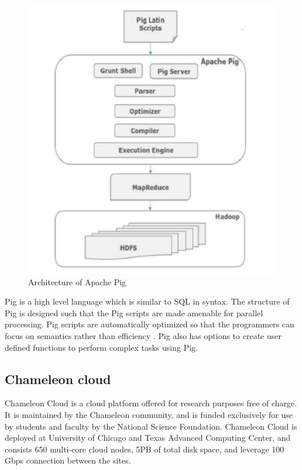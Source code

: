 \documentclass[9pt,twocolumn,twoside]{../../styles/osajnl}
\begin{document}
\begin{figure}[hptb]
\centering
\includegraphics[width=\linewidth]{images/PigArch.PNG}
\caption{ Architecture of Apache Pig \cite{www-opensource}}
\label{fig:Pig}
\end{figure}

Pig is a high level language which is similar to SQL in syntax. The structure of Pig is designed such that the Pig scripts are made amenable for parallel processing. Pig scripts are automatically optimized so that the programmers can focus on semantics rather than efficiency \cite{www-pig-apache}. Pig also has options to create user defined functions to perform complex tasks using Pig.

\subsection{Chameleon cloud}
Chameleon Cloud is a cloud platform offered for research purposes free of charge. It is maintained by the Chameleon community, and is funded exclusively for use by students and faculty by the National Science Foundation. Chameleon Cloud is deployed at University of Chicago and Texas Advanced Computing Center, and consists 650 multi-core cloud nodes, 5PB of total disk space, and leverage 100 Gbps connection between the sites. 
\end{document}
